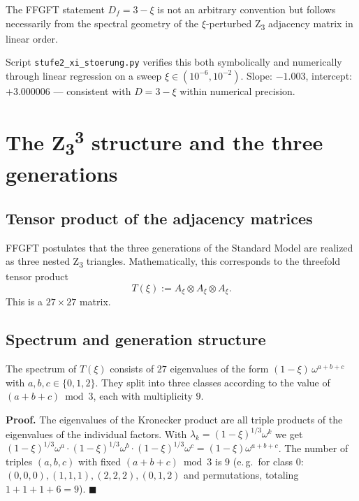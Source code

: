 \begin{keyresult}
The FFGFT statement \(D_f = 3 - \xi\) is not an arbitrary convention but follows necessarily from the spectral geometry of the \(\xi\)-perturbed Z\textsubscript{3} adjacency matrix in linear order.
\end{keyresult}

Script \texttt{stufe2\_xi\_stoerung.py} verifies this both symbolically and numerically through linear regression on a sweep \(\xi \in (10^{-6}, 10^{-2})\). Slope: \(-1.003\), intercept: \(+3.000006\) --- consistent with \(D = 3 - \xi\) within numerical precision.

\section[The Z3 cubed structure and the three generations]{The Z\textsubscript{3}\textsuperscript{3} structure and the three generations}
\label{sec:kern3}

\subsection{Tensor product of the adjacency matrices}

FFGFT postulates that the three generations of the Standard Model are realized as three nested Z\textsubscript{3} triangles. Mathematically, this corresponds to the threefold tensor product
\begin{equation}
T(\xi) := A_\xi \otimes A_\xi \otimes A_\xi.
\label{eq:T}
\end{equation}
This is a \(27 \times 27\) matrix.

\subsection{Spectrum and generation structure}

\begin{foundation}[Foundation: 27 = 3\textsuperscript{3} eigenvalues]
The spectrum of \(T(\xi)\) consists of \(27\) eigenvalues of the form \((1-\xi)\,\omega^{a+b+c}\) with \(a, b, c \in \{0, 1, 2\}\). They split into three classes according to the value of \((a+b+c) \bmod 3\), each with multiplicity \(9\).
\end{foundation}

\noindent\textbf{Proof.} The eigenvalues of the Kronecker product are all triple products of the eigenvalues of the individual factors. With \(\lambda_k = (1-\xi)^{1/3} \omega^k\) we get \((1-\xi)^{1/3} \omega^a \cdot (1-\xi)^{1/3} \omega^b \cdot (1-\xi)^{1/3} \omega^c = (1-\xi) \omega^{a+b+c}\). The number of triples \((a,b,c)\) with fixed \((a+b+c) \bmod 3\) is \(9\) (e.\,g.\ for class 0: \((0,0,0), (1,1,1), (2,2,2), (0,1,2)\) and permutations, totaling \(1 + 1 + 1 + 6 = 9\)). \(\blacksquare\)

